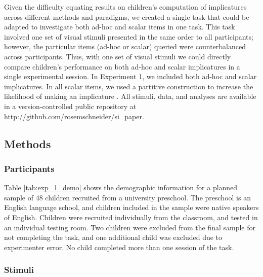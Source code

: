 \documentclass[man]{apa2}
\begin{document}
Given the difficulty equating results on children's computation of implicatures across different methods and paradigms, we created a single task that could be adapted to investigate both ad-hoc and scalar items in one task. This task involved one set of visual stimuli presented in the same order to all participants; however, the particular items (ad-hoc or scalar) queried were counterbalanced across participants. Thus, with one set of visual stimuli we could directly compare children's performance on both ad-hoc and scalar implicatures in a single experimental session. In Experiment 1, we included both ad-hoc and scalar implicatures. In all scalar items, we used a partitive construction to increase the likelihood of making an implicature \cite{degen2015}. All stimuli, data, and analyses are available in a version-controlled public repository at http://github.com/rosemschneider/si\_paper.


\subsection{Methods}

\subsubsection{Participants}

Table \ref{tab:exp_1_demo} shows the demographic information for a planned sample of 48 children recruited from a university preschool. The preschool is an English language school, and children included in the sample were native speakers of English. Children were recruited individually from the classroom, and tested in an individual testing room. Two children were excluded from the final sample for not completing the task, and one additional child was excluded due to experimenter error. No child completed more than one session of the task.


\subsubsection{Stimuli}
\end{document}
